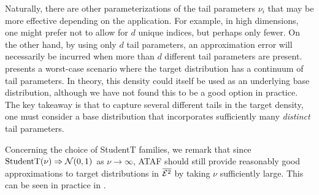 \documentclass[nohyperref]{article}
\theoremstyle{plain}
\theoremstyle{definition}
\theoremstyle{remark}
\newtheorem{remark}[theorem]{Remark}
\begin{document}

Naturally, there are other parameterizations of the tail parameters $\nu_i$ that may be more effective depending on the application. For example, in high dimensions, one might prefer not to allow for $d$ unique indices, but perhaps only fewer. On the other hand, by using only $d$ tail parameters, an approximation error will necessarily be incurred when more than $d$ different tail parameters are present.  presents a worst-case scenario where the target distribution has a continuum of tail parameters. In theory, this density could itself be used as an underlying base distribution, although we have not found this to be a good option in practice. The key takeaway is that to capture several different tails in the target density, one must consider a base distribution that incorporates sufficiently many \emph{distinct} tail parameters. 

Concerning the choice of StudentT families, we remark that since $\text{StudentT}(\nu) \Rightarrow \mathcal{N}(0,1)$ 
as $\nu \to \infty$, ATAF should still provide reasonably good approximations to target 
distributions in $\overline{\mathcal{E}^2}$ by taking $\nu$ sufficiently large. This can be seen in practice in .

\end{document}
